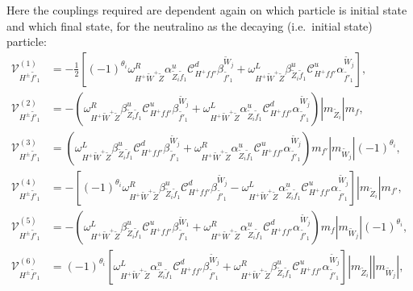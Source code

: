 \documentclass[final,3p,times]{elsarticle}
\begin{document}
Here the couplings required are dependent again on which particle is initial state and which final state, for the neutralino as the decaying (i.e.\ initial state) particle:
\begin{align}
\mathcal{V}_{H^{\pm} \tilde{f'}_1}^{(1)} &= -\frac{1}{2}[(-1)^{\theta_i}\omega_{H^+ \tilde{W}^+ \tilde{Z}}^R \alpha_{\tilde{Z}_i \tilde{f}_1}^{u} \mathcal{C}_{H^+ f f'}^d \beta_{\tilde{f'}_1}^{\tilde{W}_j} + \omega_{H^+ \tilde{W}^+ \tilde{Z}}^L \beta_{\tilde{Z}_i \tilde{f}_1}^{u} \mathcal{C}_{H^+ f f'}^u \alpha_{\tilde{f'}_1}^{\tilde{W}_j}], \\
\mathcal{V}_{H^{\pm} \tilde{f'}_1}^{(2)} &= -(\omega_{H^+ \tilde{W}^+ \tilde{Z}}^R \beta_{\tilde{Z}_i \tilde{f}_1}^{u} \mathcal{C}_{H^+ f f'}^u \beta_{\tilde{f'}_1}^{\tilde{W}_j} + \omega_{H^+ \tilde{W}^+ \tilde{Z}}^L \alpha_{\tilde{Z}_i \tilde{f}_1}^{u} \mathcal{C}_{H^+ f f'}^d \alpha_{\tilde{f'}_1}^{\tilde{W}_j})|m_{\tilde{Z}_i}|m_{f}, \\
\mathcal{V}_{H^{\pm} \tilde{f'}_1}^{(3)} &= (\omega_{H^+ \tilde{W}^+ \tilde{Z}}^L \beta_{\tilde{Z}_i \tilde{f}_1}^{u} \mathcal{C}_{H^+ f f'}^d \beta_{\tilde{f'}_1}^{\tilde{W}_j} + \omega_{H^+ \tilde{W}^+ \tilde{Z}}^R \alpha_{\tilde{Z}_i \tilde{f}_1}^{u} \mathcal{C}_{H^+ f f'}^u \alpha_{\tilde{f'}_1}^{\tilde{W}_j})m_{f'}|m_{\tilde{W}_j}|(-1)^{\theta_i}, \\
\mathcal{V}_{H^{\pm} \tilde{f'}_1}^{(4)} &= -[(-1)^{\theta_i}\omega_{H^+ \tilde{W}^+ \tilde{Z}}^R \beta_{\tilde{Z}_i \tilde{f}_1}^{u} \mathcal{C}_{H^+ f f'}^d \beta_{\tilde{f'}_1}^{\tilde{W}_j} - \omega_{H^+ \tilde{W}^+ \tilde{Z}}^L \alpha_{\tilde{Z}_i \tilde{f}_1}^{u} \mathcal{C}_{H^+ f f'}^u \alpha_{\tilde{f'}_1}^{\tilde{W}_j}]|m_{\tilde{Z}_i}|m_{f'}, \\
\mathcal{V}_{H^{\pm} \tilde{f'}_1}^{(5)} &= -(\omega_{H^+ \tilde{W}^+ \tilde{Z}}^L \beta_{\tilde{Z}_i \tilde{f}_1}^{u} \mathcal{C}_{H^+ f f'}^u \beta_{\tilde{f'}_1}^{\tilde{W}_1} + \omega_{H^+ \tilde{W}^+ \tilde{Z}}^R \alpha_{\tilde{Z}_i \tilde{f}_1}^{u} \mathcal{C}_{H^+ f f'}^d \alpha_{\tilde{f'}_1}^{\tilde{W}_j})m_{f}|m_{\tilde{W}_j}|(-1)^{\theta_i}, \\
\mathcal{V}_{H^{\pm} \tilde{f'}_1}^{(6)} &= (-1)^{\theta_i}[\omega_{H^+ \tilde{W}^+ \tilde{Z}}^L \alpha_{\tilde{Z}_i \tilde{f}_1}^{u} \mathcal{C}_{H^+ f f'}^d \beta_{\tilde{f'}_1}^{\tilde{W}_j} + \omega_{H^+ \tilde{W}^+ \tilde{Z}}^R \beta_{\tilde{Z}_i \tilde{f}_1}^{u} \mathcal{C}_{H^+ f f'}^u \alpha_{\tilde{f'}_1}^{\tilde{W}_j}]|m_{\tilde{Z}_i}||m_{\tilde{W}_j}|, \\

\end{align}
\end{document}
